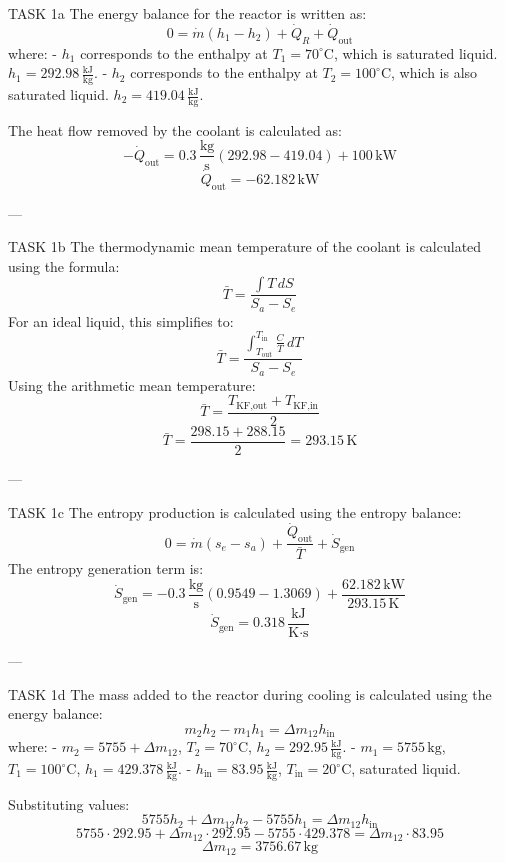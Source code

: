 TASK 1a  
The energy balance for the reactor is written as:  
\[
0 = \dot{m} (h_1 - h_2) + \dot{Q}_R + \dot{Q}_{\text{out}}
\]  
where:  
- \( h_1 \) corresponds to the enthalpy at \( T_1 = 70^\circ\text{C} \), which is saturated liquid.  
  \( h_1 = 292.98 \, \frac{\text{kJ}}{\text{kg}} \).  
- \( h_2 \) corresponds to the enthalpy at \( T_2 = 100^\circ\text{C} \), which is also saturated liquid.  
  \( h_2 = 419.04 \, \frac{\text{kJ}}{\text{kg}} \).  

The heat flow removed by the coolant is calculated as:  
\[
-\dot{Q}_{\text{out}} = 0.3 \, \frac{\text{kg}}{\text{s}} \left( 292.98 - 419.04 \right) + 100 \, \text{kW}
\]  
\[
\dot{Q}_{\text{out}} = -62.182 \, \text{kW}
\]  

---

TASK 1b  
The thermodynamic mean temperature of the coolant is calculated using the formula:  
\[
\bar{T} = \frac{\int T \, dS}{S_a - S_e}
\]  
For an ideal liquid, this simplifies to:  
\[
\bar{T} = \frac{\int_{T_{\text{out}}}^{T_{\text{in}}} \frac{C}{T} \, dT}{S_a - S_e}
\]  
Using the arithmetic mean temperature:  
\[
\bar{T} = \frac{T_{\text{KF,out}} + T_{\text{KF,in}}}{2}
\]  
\[
\bar{T} = \frac{298.15 + 288.15}{2} = 293.15 \, \text{K}
\]  

---

TASK 1c  
The entropy production is calculated using the entropy balance:  
\[
0 = \dot{m} (s_e - s_a) + \frac{\dot{Q}_{\text{out}}}{\bar{T}} + \dot{S}_{\text{gen}}
\]  
The entropy generation term is:  
\[
\dot{S}_{\text{gen}} = -0.3 \, \frac{\text{kg}}{\text{s}} \left( 0.9549 - 1.3069 \right) + \frac{62.182 \, \text{kW}}{293.15 \, \text{K}}
\]  
\[
\dot{S}_{\text{gen}} = 0.318 \, \frac{\text{kJ}}{\text{K·s}}
\]  

---

TASK 1d  
The mass added to the reactor during cooling is calculated using the energy balance:  
\[
m_2 h_2 - m_1 h_1 = \Delta m_{12} h_{\text{in}}
\]  
where:  
- \( m_2 = 5755 + \Delta m_{12} \), \( T_2 = 70^\circ\text{C} \), \( h_2 = 292.95 \, \frac{\text{kJ}}{\text{kg}} \).  
- \( m_1 = 5755 \, \text{kg} \), \( T_1 = 100^\circ\text{C} \), \( h_1 = 429.378 \, \frac{\text{kJ}}{\text{kg}} \).  
- \( h_{\text{in}} = 83.95 \, \frac{\text{kJ}}{\text{kg}} \), \( T_{\text{in}} = 20^\circ\text{C} \), saturated liquid.  

Substituting values:  
\[
5755 h_2 + \Delta m_{12} h_2 - 5755 h_1 = \Delta m_{12} h_{\text{in}}
\]  
\[
5755 \cdot 292.95 + \Delta m_{12} \cdot 292.95 - 5755 \cdot 429.378 = \Delta m_{12} \cdot 83.95
\]  
\[
\Delta m_{12} = 3756.67 \, \text{kg}
\]  